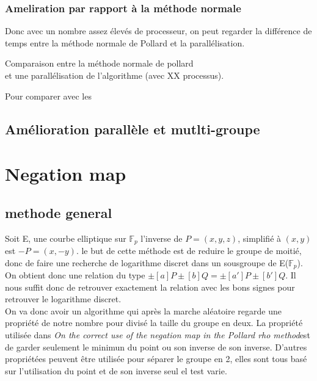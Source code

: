 \documentclass[a4paper,10pt]{report}
\newcommand{\Fp}{\mathbb{F}_p}
\newcommand{\article}{\textit{On the correct use of the negation map in the Pollard rho method}}
\begin{document}
\subsection{Ameliration par rapport à la méthode normale}

Donc avec un nombre assez élevés de processeur, on peut regarder la différence de temps entre la méthode normale de Pollard et la parallélisation.

\begin{center}
  Comparaison entre la méthode normale de pollard\\
 et une parallélisation de l'algorithme (avec XX processus).
\end{center}

Pour comparer avec les 

\section{Amélioration parallèle et mutlti-groupe}


\chapter{Negation map}

\section{methode general}

Soit E, une courbe elliptique sur $\Fp$ l'inverse de $P = (x,y,z)$, simplifié à $(x,y)$ est $-P = (x,-y)$. le but de cette méthode est de reduire le groupe de moitié,
donc de faire une recherche de logarithme discret dans un sousgroupe de E($\Fp$). On obtient donc une relation du type $\pm[a]P \pm[b]Q = \pm[a']P \pm[b']Q$. Il nous suffit donc de retrouver exactement 
la relation avec les bons signes pour retrouver le logarithme discret.\\

On va donc avoir un algorithme qui après la marche aléatoire regarde une propriété de notre nombre pour divisé la taille du groupe en deux. La propriété utilisée dans \article est de garder seulement le minimun du point ou son 
inverse de son inverse. D'autres propriétées peuvent être utilisée pour séparer le groupe en 2, elles sont tous basé sur l'utilisation du point et de son inverse seul el test varie.\\
\end{document}
